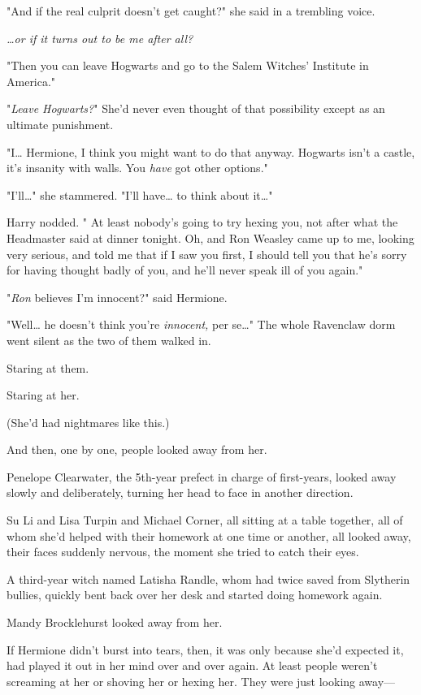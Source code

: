 "And if the real culprit doesn't get caught?" she said in a trembling voice.

\emph{{\ldots}or if it turns out to be me after all?}

"Then you can leave Hogwarts and go to the Salem Witches' Institute in America."

"\emph{Leave Hogwarts?}" She'd never even thought of that possibility except as 
an ultimate punishment.

"I{\ldots} Hermione, I think you might want to do that anyway. Hogwarts isn't a 
castle, it's insanity with walls. You \emph{have} got other options."

"I'll{\ldots}" she stammered. "I'll have{\ldots} to think about it{\ldots}"

Harry nodded. " At least nobody's going to try hexing you, not after what the 
Headmaster said at dinner tonight. Oh, and Ron Weasley came up to me, looking 
very serious, and told me that if I saw you first, I should tell you that he's 
sorry for having thought badly of you, and he'll never speak ill of you again."

"\emph{Ron} believes I'm innocent?" said Hermione.

"Well{\ldots} he doesn't think you're \emph{innocent,} per se{\ldots}"
\sbreak
The whole Ravenclaw dorm went silent as the two of them walked in.

Staring at them.

Staring at her.

(She'd had nightmares like this.)

And then, one by one, people looked away from her.

Penelope Clearwater, the 5th-year prefect in charge of first-years, looked away 
slowly and deliberately, turning her head to face in another direction.

Su Li and Lisa Turpin and Michael Corner, all sitting at a table together, all 
of whom she'd helped with their homework at one time or another, all looked 
away, their faces suddenly nervous, the moment she tried to catch their eyes.

A third-year witch named Latisha Randle, whom \SPHEW had twice saved from 
Slytherin bullies, quickly bent back over her desk and started doing homework 
again.

Mandy Brocklehurst looked away from her.

If Hermione didn't burst into tears, then, it was only because she'd expected 
it, had played it out in her mind over and over again. At least people weren't 
screaming at her or shoving her or hexing her. They were just looking away---

